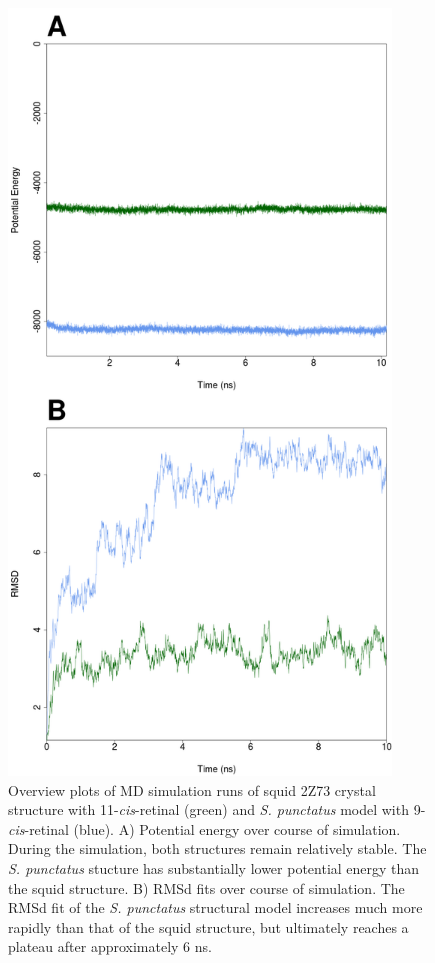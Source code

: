 \begin{figure}[hb]
  \centering
  \includegraphics[width=4in]{./Chapter_RhodStruct/img/TpSp_mdoutRMS.png}
  \caption[MD summary plots]{Overview plots of MD simulation runs of squid 2Z73 crystal structure with 11-\textit{cis}-retinal (green) and \textit{S. punctatus} model with 9-\textit{cis}-retinal (blue). A) Potential energy over course of simulation. During the simulation, both structures remain relatively stable. The \textit{S. punctatus} stucture has substantially lower potential energy than the squid structure. B) RMSd fits over course of simulation. The RMSd fit of the \textit{S. punctatus} structural model increases much more rapidly than that of the squid structure, but ultimately reaches a plateau after approximately 6 ns.}
  \label{fig:ChRhodS_MDEnergyRMSD}
\end{figure}
